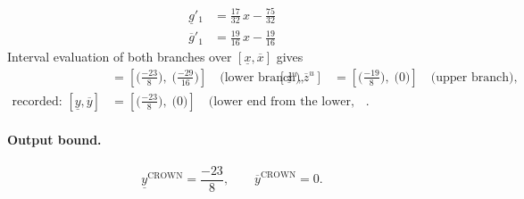 \documentclass[11pt]{article}
\begin{document}
\begin{align*}
\underline{g}'_{1} &= \frac{17}{32}\,x - \frac{75}{32}
\end{align*}
\begin{align*}
\overline{g}'_{1} &= \frac{19}{16}\,x - \frac{19}{16}
\end{align*}
Interval evaluation of both branches over $[\underline{x}, \overline{x}]$ gives
\begin{align*}
[\underline{z}^{\ell}, \overline{z}^{\ell}] &= [\bigl(\frac{-23}{8}\bigr),\; \bigl(\frac{-29}{16}\bigr)] \quad\text{(lower branch)}, & [\underline{z}^{u}, \overline{z}^{u}] &= [\bigl(\frac{-19}{8}\bigr),\; \bigl(0\bigr)] \quad\text{(upper branch)}, \\
\text{recorded: } [\underline{y}, \overline{y}] &= [\bigl(\frac{-23}{8}\bigr),\; \bigl(0\bigr)] \quad\text{(lower end from the lower, upper end from the upper branch)}.
\end{align*}
\paragraph{Output bound.}
\begin{equation*}
\underline{y}^{\text{CROWN}} = \frac{-23}{8}, \qquad \overline{y}^{\text{CROWN}} = 0.
\end{equation*}
\end{document}
